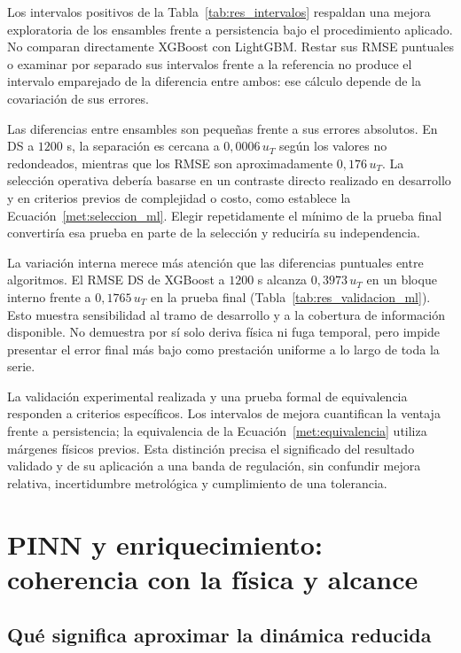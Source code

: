 Los intervalos positivos de la Tabla~\ref{tab:res_intervalos} respaldan una mejora exploratoria de los ensambles frente a persistencia bajo el procedimiento aplicado. No comparan directamente XGBoost con LightGBM. Restar sus RMSE puntuales o examinar por separado sus intervalos frente a la referencia no produce el intervalo emparejado de la diferencia entre ambos: ese cálculo depende de la covariación de sus errores.

Las diferencias entre ensambles son pequeñas frente a sus errores absolutos. En DS a $1200$ s, la separación es cercana a $0{,}0006\,u_T$ según los valores no redondeados, mientras que los RMSE son aproximadamente $0{,}176\,u_T$. La selección operativa debería basarse en un contraste directo realizado en desarrollo y en criterios previos de complejidad o costo, como establece la Ecuación~\eqref{met:seleccion_ml}. Elegir repetidamente el mínimo de la prueba final convertiría esa prueba en parte de la selección y reduciría su independencia.

La variación interna merece más atención que las diferencias puntuales entre algoritmos. El RMSE DS de XGBoost a $1200$ s alcanza $0{,}3973\,u_T$ en un bloque interno frente a $0{,}1765\,u_T$ en la prueba final (Tabla~\ref{tab:res_validacion_ml}). Esto muestra sensibilidad al tramo de desarrollo y a la cobertura de información disponible. No demuestra por sí solo deriva física ni fuga temporal, pero impide presentar el error final más bajo como prestación uniforme a lo largo de toda la serie.

La validación experimental realizada y una prueba formal de equivalencia responden a criterios específicos. Los intervalos de mejora cuantifican la ventaja frente a persistencia; la equivalencia de la Ecuación~\eqref{met:equivalencia} utiliza márgenes físicos previos. Esta distinción precisa el significado del resultado validado y de su aplicación a una banda de regulación, sin confundir mejora relativa, incertidumbre metrológica y cumplimiento de una tolerancia.
\FloatBarrier

\section{PINN y enriquecimiento: coherencia con la física y alcance}
\label{dis:hibridacion}

\subsection{Qué significa aproximar la dinámica reducida}

